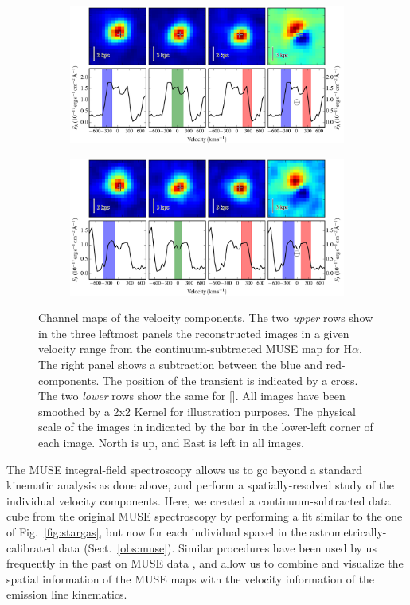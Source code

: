 \documentclass[traditabstract]{aa}
\newcommand{\ha}{H$\alpha$}
\newcommand{\nii}{[\ion{N}{ii}]}
\begin{document}
\begin{figure}
\begin{subfigure}{.49\textwidth}
  \includegraphics[width=0.999\linewidth]{fig/MUSE_Ha_channelmaps.pdf}
\end{subfigure}
\begin{subfigure}{.49\textwidth}
  \includegraphics[width=0.999\linewidth]{fig/MUSE_NII_channelmaps.pdf}
\end{subfigure}

\caption{Channel maps of the velocity components. The two \textit{upper} rows show in the three leftmost panels the reconstructed images in a given velocity range from the continuum-subtracted MUSE map for \ha. The right panel shows a subtraction between the blue and red-components. The position of the transient is indicated by a cross. The two \textit{lower} rows show the same for \nii. All images have been smoothed by a 2x2 Kernel for illustration purposes. The physical scale of the images in indicated by the bar in the lower-left corner of each image. North is up, and East is left in all images.}
\label{fig:channelmaps}
\end{figure}

The MUSE integral-field spectroscopy allows us to go beyond a standard kinematic analysis as done above, and perform a spatially-resolved study of the individual velocity components. Here, we created a continuum-subtracted data cube from the original MUSE spectroscopy by performing a fit similar to the one of Fig.~\ref{fig:stargas}, but now for each individual spaxel in the astrometrically-calibrated data (Sect.~\ref{obs:muse}). Similar procedures have been used by us frequently in the past on MUSE data \citep{2016MNRAS.455.4087G, 2016ApJ...830L..32P, 2017arXiv170205430K}, and allow us to combine and visualize the spatial information of the MUSE maps with the velocity information of the emission line kinematics.
\end{document}
